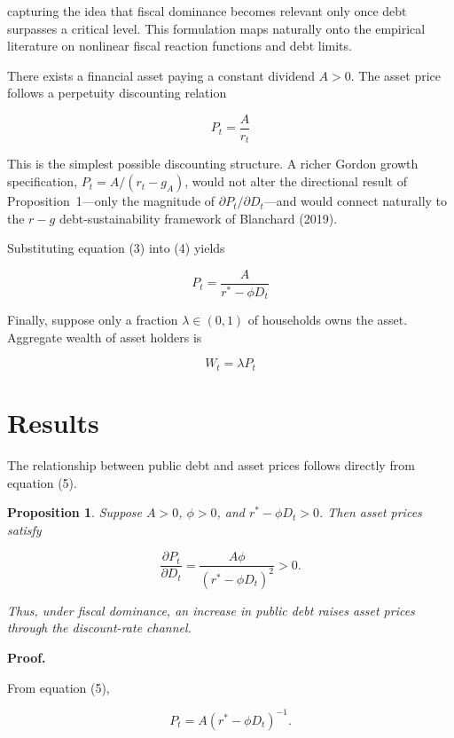 \documentclass[3p]{elsarticle}
\newtheorem{proposition}{Proposition}
\begin{document}
capturing the idea that fiscal dominance becomes relevant only once debt surpasses a
critical level. This formulation maps naturally onto the empirical literature on nonlinear
fiscal reaction functions and debt limits.

There exists a financial asset paying a constant dividend $A>0$. The asset price follows
a perpetuity discounting relation

\begin{equation}
P_t = \frac{A}{r_t}
\end{equation}

This is the simplest possible discounting structure. A richer Gordon growth specification,
$P_t = A/(r_t - g_A)$, would not alter the directional result of Proposition~1---only the
magnitude of $\partial P_t / \partial D_t$---and would connect naturally to the $r-g$
debt-sustainability framework of Blanchard (2019).

Substituting equation (3) into (4) yields

\begin{equation}
P_t = \frac{A}{r^{*}-\phi D_t}
\end{equation}

Finally, suppose only a fraction $\lambda \in (0,1)$ of households owns the asset.
Aggregate wealth of asset holders is

\begin{equation}
W_t = \lambda P_t
\end{equation}

\section{Results}

The relationship between public debt and asset prices follows directly from equation (5).

\begin{proposition}
Suppose $A>0$, $\phi>0$, and $r^{*}-\phi D_t>0$. Then asset prices satisfy

\[
\frac{\partial P_t}{\partial D_t} = \frac{A\phi}{(r^{*}-\phi D_t)^2} > 0.
\]

Thus, under fiscal dominance, an increase in public debt raises asset prices through the
discount-rate channel.
\end{proposition}

\textbf{Proof.}

From equation (5),

\[
P_t = A(r^{*}-\phi D_t)^{-1}.
\]
\end{document}
